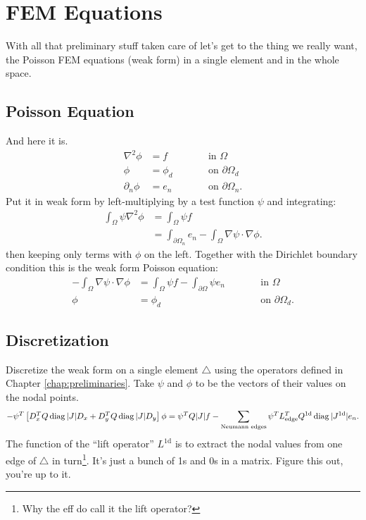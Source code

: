 \chapter{FEM Equations}
\label{chap:fem}

With all that preliminary stuff taken care of let's get to the thing we really want, the Poisson FEM equations (weak form) in a single element and in the whole space.

\section{Poisson Equation}

And here it is.
%
\begin{equation}
\begin{aligned}
\nabla^2 \phi &= f \qquad &&\textrm{in $\Omega$} \\
\phi &= \phi_d \qquad &&\textrm{on $\partial \Omega_d$} \\
\partial_n \phi &= e_n \qquad &&\textrm{on $\partial \Omega_n$.}
\end{aligned}
\end{equation}
%
Put it in weak form by left-multiplying by a test function $\psi$ and integrating:
%
\begin{equation}
\begin{aligned}
\int_\Omega \psi \nabla^2 \phi &= \int_\Omega \psi f \\
&= \int_{\partial \Omega_n} e_n - \int_\Omega \nabla \psi \cdot \nabla \phi.
\end{aligned}
\end{equation}
%
then keeping only terms with $\phi$ on the left.  Together with the Dirichlet boundary condition this is the weak form Poisson equation:
%
\begin{equation}
\boxed{
\begin{aligned}
- \int_\Omega \nabla \psi \cdot \nabla \phi &= \int_\Omega \psi f - \int_{\partial \Omega} \psi e_n \qquad &&\textrm{in $\Omega$} \\
\phi &= \phi_d \qquad &&\textrm{on $\partial \Omega_d$}.
\end{aligned}
}
\end{equation}

\section{Discretization}

Discretize the weak form on a single element $\bigtriangleup$ using the operators defined in Chapter \ref{chap:preliminaries}.  Take $\psi$ and $\phi$ to be the vectors of their values on the nodal points.
%
\begin{equation}
- \psi^T \left[ D_x^T Q \operatorname{diag} |J| D_x + D_y^T Q \operatorname{diag} |J| D_y \right] \phi = \psi^T Q |J| f - \sum_\textrm{Neumann edges} \psi^T L_\textrm{edge}^T Q^\textrm{1d}  \operatorname{diag}| J^\textrm{1d}| e_n.
\end{equation}
%
The function of the ``lift operator'' $L^\textrm{1d}$ is to extract the nodal values from one edge of $\bigtriangleup$ in turn\footnote{Why the eff do \cite{hesthaven2007nodal} call it the lift operator?}.  It's just a bunch of 1s and 0s in a matrix.  Figure this out, you're up to it.

